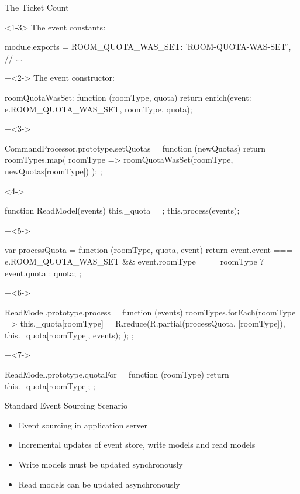 \begin{frame}[fragile]{The Ticket Count}

\begin{onlyenv}<1-3>
The event constants:

\begin{highlight}{1}
module.exports = {
  ROOM_QUOTA_WAS_SET: 'ROOM-QUOTA-WAS-SET',
  // ...
}
\end{highlight}

\onslide+<2->
The event constructor:

\begin{highlight}{2}
roomQuotaWasSet: function (roomType, quota) {
    return enrich({event: e.ROOM_QUOTA_WAS_SET, roomType, quota});
}
\end{highlight}

\onslide+<3->
\begin{highlight}{3}
CommandProcessor.prototype.setQuotas = function (newQuotas) {
  return roomTypes.map(
          roomType => roomQuotaWasSet(roomType, newQuotas[roomType])
  );
};
\end{highlight}
\end{onlyenv}

\begin{onlyenv}<4->
\begin{highlight}{4}
function ReadModel(events) {
  this._quota = {};
  this.process(events);
}
\end{highlight}
\onslide+<5->
\begin{highlight}{5}
var processQuota = function (roomType, quota, event) { 
    return event.event === e.ROOM_QUOTA_WAS_SET && 
           event.roomType === roomType ? event.quota : quota; };
\end{highlight}
\onslide+<6->
\begin{highlight}{6}
ReadModel.prototype.process = function (events) {
  roomTypes.forEach(roomType => {
    this._quota[roomType] = R.reduce(R.partial(processQuota, [roomType]), 
                            this._quota[roomType], events);
  });
};
\end{highlight}
\onslide+<7->
\begin{highlight}{7}
ReadModel.prototype.quotaFor = function (roomType) {
  return this._quota[roomType];
};
\end{highlight}
\end{onlyenv}

\end{frame}


\begin{frame}[fragile]{Standard Event Sourcing Scenario}

\begin{itemize}
\item Event sourcing in application server
\item Incremental updates of event store, write models and read models
\item Write models must be updated synchronously
\item Read models can be updated asynchronously
\end{itemize}

\end{frame}

